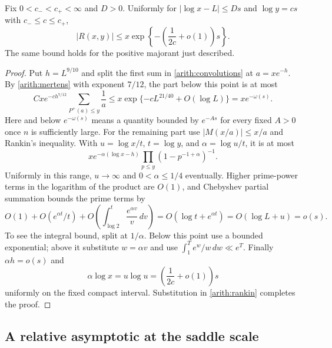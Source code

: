 \begin{lemma}\label{arith:upper-local}
Fix $0<c_-<c_+<\infty$ and $D>0$. Uniformly for
$|\log x-L|\le Ds$ and $\log y=cs$ with $c_-\le c\le c_+$,
\[
 |R(x,y)|\le x\exp\left\{-\left(\frac1{2c}+o(1)\right)s\right\}.
\]
The same bound holds for the positive majorant just described.
\end{lemma}
\begin{proof}
Put $h=L^{9/10}$ and split the first sum in
\eqref{arith:convolutions} at $a=xe^{-h}$. By
\eqref{arith:mertens} with exponent $7/12$, the part below this point is
at most
\[
 Cxe^{-ch^{7/12}}\sum_{P^+(a)\le y}\frac1a
 \le x\exp\{-cL^{21/40}+O(\log L)\}=x e^{-\omega(s)}.
\]
Here and below $e^{-\omega(s)}$ means a quantity bounded by
$e^{-As}$ for every fixed $A>0$ once $n$ is sufficiently large.
For the remaining part use $|M(x/a)|\le x/a$ and Rankin's inequality.
With $u=\log x/t$, $t=\log y$, and $\alpha=\log u/t$, it is at most
\begin{equation}\label{arith:rankin}
 xe^{-\alpha(\log x-h)}
 \prod_{p\le y}(1-p^{-1+\alpha})^{-1}.
\end{equation}
Uniformly in this range, $u\to\infty$ and $0<\alpha\le1/4$ eventually.
Higher prime-power terms in the logarithm of the product are $O(1)$,
and Chebyshev partial summation bounds the prime terms by
\[
 O(1)+O(e^{\alpha t}/t)
 +O\left(\int_{\log2}^t\frac{e^{\alpha v}}v\,dv\right)
 =O(\log t+e^{\alpha t})=O(\log L+u)=o(s).
\]
To see the integral bound, split at $1/\alpha$. Below this point use a
bounded exponential; above it substitute $w=\alpha v$ and use
$\int_1^T e^w/w\,dw\ll e^T$. Finally $\alpha h=o(s)$ and
\[
 \alpha\log x=u\log u=\left(\frac1{2c}+o(1)\right)s
\]
uniformly on the fixed compact interval. Substitution in
\eqref{arith:rankin} completes the proof.
\end{proof}

\subsection{A relative asymptotic at the saddle scale}

